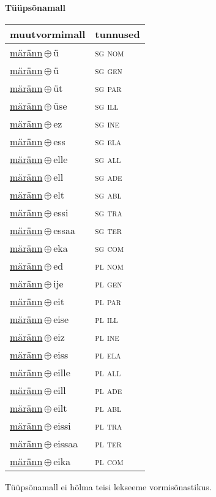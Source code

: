 

\vspace{3.5em}
\noindent \begin{minipage}{\textwidth}
\noindent \textbf{Tüüpsõnamall \,}\\

\begin{sideways}
\begin{tabular}{l l}
muutvormimall & tunnused \\
\hline
\underline{märänn}\,$\oplus$\,ü & \textsc{ sg nom } \\
\underline{märänn}\,$\oplus$\,ü & \textsc{ sg gen } \\
\underline{märänn}\,$\oplus$\,üt & \textsc{ sg par } \\
\underline{märänn}\,$\oplus$\,üse & \textsc{ sg ill } \\
\underline{märänn}\,$\oplus$\,ez & \textsc{ sg ine } \\
\underline{märänn}\,$\oplus$\,ess & \textsc{ sg ela } \\
\underline{märänn}\,$\oplus$\,elle & \textsc{ sg all } \\
\underline{märänn}\,$\oplus$\,ell & \textsc{ sg ade } \\
\underline{märänn}\,$\oplus$\,elt & \textsc{ sg abl } \\
\underline{märänn}\,$\oplus$\,essi & \textsc{ sg tra } \\
\underline{märänn}\,$\oplus$\,essaa & \textsc{ sg ter } \\
\underline{märänn}\,$\oplus$\,eka & \textsc{ sg com } \\
\underline{märänn}\,$\oplus$\,ed & \textsc{ pl nom } \\
\underline{märänn}\,$\oplus$\,ije & \textsc{ pl gen } \\
\underline{märänn}\,$\oplus$\,eit & \textsc{ pl par } \\
\underline{märänn}\,$\oplus$\,eise & \textsc{ pl ill } \\
\underline{märänn}\,$\oplus$\,eiz & \textsc{ pl ine } \\
\underline{märänn}\,$\oplus$\,eiss & \textsc{ pl ela } \\
\underline{märänn}\,$\oplus$\,eille & \textsc{ pl all } \\
\underline{märänn}\,$\oplus$\,eill & \textsc{ pl ade } \\
\underline{märänn}\,$\oplus$\,eilt & \textsc{ pl abl } \\
\underline{märänn}\,$\oplus$\,eissi & \textsc{ pl tra } \\
\underline{märänn}\,$\oplus$\,eissaa & \textsc{ pl ter } \\
\underline{märänn}\,$\oplus$\,eika & \textsc{ pl com } \\
\end{tabular}
\end{sideways}
\label{tab:tüüpsõnamall-märännü}

\end{minipage}

 
\vspace{1em}
\noindent Tüüpsõnamall  ei hõlma teisi lekseeme vormi\-sõnastikus.
